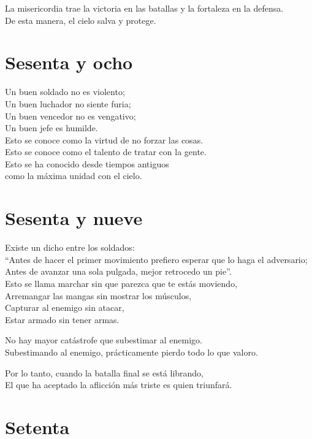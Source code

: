 \documentclass[hidelinks]{memoir}
\begin{document}
	La misericordia trae la victoria en las batallas y la fortaleza en la
	defensa.\\
	De esta manera, el cielo salva y protege.
	
	\chapter*{Sesenta y ocho}
	
	Un buen soldado no es violento;\\
	Un buen luchador no siente furia;\\
	Un buen vencedor no es vengativo;\\
	Un buen jefe es humilde.\\
	Esto se conoce como la virtud de no forzar las cosas.\\
	Esto se conoce como el talento de tratar con la gente.\\
	Esto se ha conocido desde tiempos antiguos\\
	como la máxima unidad con el cielo.
	
	\chapter*{Sesenta y nueve}
	
	Existe un dicho entre los soldados:\\
	``Antes de hacer el primer movimiento prefiero esperar que lo haga el
	adversario;\\
	Antes de avanzar una sola pulgada, mejor retrocedo un pie''.\\
	Esto se llama marchar sin que parezca que te estás moviendo,\\
	Arremangar las mangas sin mostrar los músculos,\\
	Capturar al enemigo sin atacar,\\
	Estar armado sin tener armas.
	
	No hay mayor catástrofe que subestimar al enemigo.\\
	Subestimando al enemigo, prácticamente pierdo todo lo que valoro.
	
	Por lo tanto, cuando la batalla final se está librando,\\
	El que ha aceptado la aflicción más triste es quien triunfará.
	
	\chapter*{Setenta}
	
\end{document}
